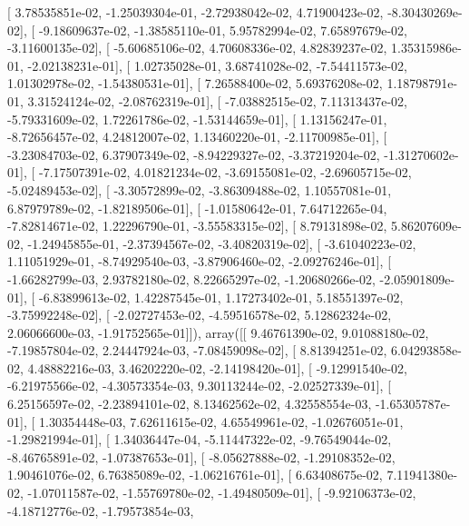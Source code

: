 \documentclass{article}
\begin{document}
       [  3.78535851e-02,  -1.25039304e-01,  -2.72938042e-02,
          4.71900423e-02,  -8.30430269e-02],
       [ -9.18609637e-02,  -1.38585110e-01,   5.95782994e-02,
          7.65897679e-02,  -3.11600135e-02],
       [ -5.60685106e-02,   4.70608336e-02,   4.82839237e-02,
          1.35315986e-01,  -2.02138231e-01],
       [  1.02735028e-01,   3.68741028e-02,  -7.54411573e-02,
          1.01302978e-02,  -1.54380531e-01],
       [  7.26588400e-02,   5.69376208e-02,   1.18798791e-01,
          3.31524124e-02,  -2.08762319e-01],
       [ -7.03882515e-02,   7.11313437e-02,  -5.79331609e-02,
          1.72261786e-02,  -1.53144659e-01],
       [  1.13156247e-01,  -8.72656457e-02,   4.24812007e-02,
          1.13460220e-01,  -2.11700985e-01],
       [ -3.23084703e-02,   6.37907349e-02,  -8.94229327e-02,
         -3.37219204e-02,  -1.31270602e-01],
       [ -7.17507391e-02,   4.01821234e-02,  -3.69155081e-02,
         -2.69605715e-02,  -5.02489453e-02],
       [ -3.30572899e-02,  -3.86309488e-02,   1.10557081e-01,
          6.87979789e-02,  -1.82189506e-01],
       [ -1.01580642e-01,   7.64712265e-04,  -7.82814671e-02,
          1.22296790e-01,  -3.55583315e-02],
       [  8.79131898e-02,   5.86207609e-02,  -1.24945855e-01,
         -2.37394567e-02,  -3.40820319e-02],
       [ -3.61040223e-02,   1.11051929e-01,  -8.74929540e-03,
         -3.87906460e-02,  -2.09276246e-01],
       [ -1.66282799e-03,   2.93782180e-02,   8.22665297e-02,
         -1.20680266e-02,  -2.05901809e-01],
       [ -6.83899613e-02,   1.42287545e-01,   1.17273402e-01,
          5.18551397e-02,  -3.75992248e-02],
       [ -2.02727453e-02,  -4.59516578e-02,   5.12862324e-02,
          2.06066600e-03,  -1.91752565e-01]]), array([[  9.46761390e-02,   9.01088180e-02,  -7.19857804e-02,
          2.24447924e-03,  -7.08459098e-02],
       [  8.81394251e-02,   6.04293858e-02,   4.48882216e-03,
          3.46202220e-02,  -2.14198420e-01],
       [ -9.12991540e-02,  -6.21975566e-02,  -4.30573354e-03,
          9.30113244e-02,  -2.02527339e-01],
       [  6.25156597e-02,  -2.23894101e-02,   8.13462562e-02,
          4.32558554e-03,  -1.65305787e-01],
       [  1.30354448e-03,   7.62611615e-02,   4.65549961e-02,
         -1.02676051e-01,  -1.29821994e-01],
       [  1.34036447e-04,  -5.11447322e-02,  -9.76549044e-02,
         -8.46765891e-02,  -1.07387653e-01],
       [ -8.05627888e-02,  -1.29108352e-02,   1.90461076e-02,
          6.76385089e-02,  -1.06216761e-01],
       [  6.63408675e-02,   7.11941380e-02,  -1.07011587e-02,
         -1.55769780e-02,  -1.49480509e-01],
       [ -9.92106373e-02,  -4.18712776e-02,  -1.79573854e-03,
\end{document}
